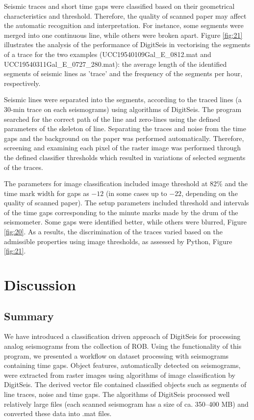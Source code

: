 \documentclass[sensors,article,accept,moreauthors,pdftex]{Definitions/mdpi}
\begin{document}
{Seismic }traces and short time gaps {were classified }based on their geometrical characteristics and threshold{. Therefore, }the quality of scanned paper may affect the automatic recognition and interpretation. {For instance}, some segments were merged into one continuous line, while others were broken apart. Figure \ref{fig:21} {illustrates }the analysis of the performance of DigitSeis in vectorising {the }segments of a trace for the two examples (UCC19540109Gal\_E\_0812.mat and UCC19540311Gal\_E\_0727\_280.mat): the average length of the {identified segments of seismic lines }as 'trace' and the frequency of the segments per hour{, respectively}.  

Seismic lines were separated{ into the }segments{, }according to the traced lines \linebreak (a 30-min trace on each seismograms) {using algorithms of }DigitSeis. The program searched for the correct path of the line and zero-lines using {the defined }parameters{ of the skeleton of line. }Separating {the } traces and noise from the time gaps and {the }background on the paper was performed automatically. Therefore, screening and examining each pixel of the raster image was performed through the defined classifier thresholds{ which }resulted in variations of {selected }segments of the traces. 

{The }parameters for image classification included image threshold {at }82\%{ and the }time mark width for gaps as $-12$ (in some cases up to $-22$, depending on the quality of scanned paper). The setup parameters included threshold and intervals of {the }time gaps corresponding to the minute marks made by the drum of the seismometer. Some gaps were identified better{, }while others{ }were blurred, Figure \ref{fig:20}. As a results, {the }discrimination of the traces {varied }based on {the }admissible properties using {image }thresholds, as assessed by Python, Figure \ref{fig:21}. 

\section{Discussion}

\subsection{Summary}
{We have }introduced a classification driven approach of DigitSeis for processing analog seismograms {from the collection of ROB}. Using the functionality of this program{, }we presented a workflow{ }on dataset{ processing with seismograms containing time gaps}. {Object features}, automatically detected on seismograms{, were extracted from raster images using algorithms of image classification by DigitSeis. The }derived{ }vector file contained{ }classified objects {such as }segments of line traces, noise and time gaps{. }The algorithms of DigitSeis processed well relatively large files (each scanned seismogram has a size of ca. 350--400 MB) and converted these data into .mat files. 
\end{document}
